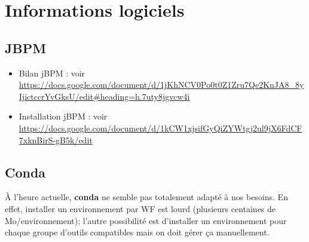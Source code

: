 \chapter{Informations logiciels}



\section{JBPM}

\begin{itemize}
\item Bilan jBPM : voir \url{https://docs.google.com/document/d/1jKhNCV0Po0t0Z1Zru7Qe2KnJA8_8yIjictccrYvGksU/edit#heading=h.7uty8jgvcw4i}
\item Installation jBPM : voir \url{https://docs.google.com/document/d/1kCW1xjsifGyQiZYWtgj2ul9jX6FdCF7xknBirS-gB5k/edit}
\end{itemize}

\section{Conda}
À l'heure actuelle, \textbf{conda} ne semble pas totalement adapté à nos besoins.
En effet, installer un environnement par WF est lourd (plusieurs centaines de Mo/environnement); l'autre possibilité est d'installer un environnement pour chaque groupe d'outils compatibles mais on doit gérer ça manuellement.

